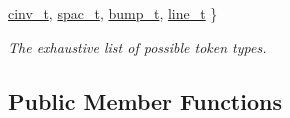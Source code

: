 \begin{DoxyCompactItemize}
\mbox{\hyperlink{class_token_split_aeb8df0fee5549b7698495e5b408acc77a71fd13903fe80c23b41b53b1d4767b54}{cinv\+\_\+t}}, 
\mbox{\hyperlink{class_token_split_aeb8df0fee5549b7698495e5b408acc77ab16805e40568780051050c201d041c78}{spac\+\_\+t}}, 
\mbox{\hyperlink{class_token_split_aeb8df0fee5549b7698495e5b408acc77ad2121dca729793a532ed26d2e2ad7478}{bump\+\_\+t}}, 
\newline
\mbox{\hyperlink{class_token_split_aeb8df0fee5549b7698495e5b408acc77a7fd50cbc18c4d424e2eedd52c916b89a}{line\+\_\+t}}
 \}
\begin{DoxyCompactList}\small\item\em The exhaustive list of possible token types. \end{DoxyCompactList}\end{DoxyCompactItemize}
\subsection*{Public Member Functions}

